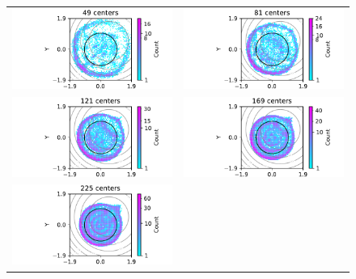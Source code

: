 \documentclass[12pt]{report} %
\begin{document}
\begin{figure}[h]
  \hspace*{-2cm}
  \begin{tabular}{cc}
    \includegraphics[width=.6\textwidth]{imagenes/experiments/2d/statistical_2d_full_scheduler_interpolation/parabola/circle_c49_parabola_gaussian_kernel.pdf}  &
    \includegraphics[width=.6\textwidth]{imagenes/experiments/2d/statistical_2d_full_scheduler_interpolation/parabola/circle_c81_parabola_gaussian_kernel.pdf}    \\
    \includegraphics[width=.6\textwidth]{imagenes/experiments/2d/statistical_2d_full_scheduler_interpolation/parabola/circle_c121_parabola_gaussian_kernel.pdf} &
    \includegraphics[width=.6\textwidth]{imagenes/experiments/2d/statistical_2d_full_scheduler_interpolation/parabola/circle_c169_parabola_gaussian_kernel.pdf}   \\
    \includegraphics[width=.6\textwidth]{imagenes/experiments/2d/statistical_2d_full_scheduler_interpolation/parabola/circle_c225_parabola_gaussian_kernel.pdf}

\end{tabular}
\end{figure}
\end{document}
